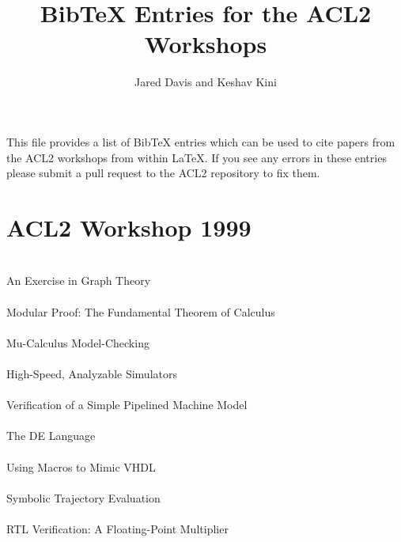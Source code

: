 \documentclass{article}
\title{BibTeX Entries for the ACL2 Workshops}
\author{Jared Davis and Keshav Kini}
\begin{document}
\maketitle

This file provides a list of BibTeX entries which can be used to cite papers
from the ACL2 workshops from within \LaTeX{}.  If you see any errors in these
entries please submit a pull request to the ACL2 repository to fix them.


\section{ACL2 Workshop 1999}

\cite{99-moore-graph} \\
An Exercise in Graph Theory \\

\cite{99-kaufmann-ftc} \\
Modular Proof: The Fundamental Theorem of Calculus \\

\cite{99-manolios-mu} \\
Mu-Calculus Model-Checking \\

\cite{99-greve-simulators} \\
High-Speed, Analyzable Simulators \\

\cite{99-sawada-pipelined} \\
Verification of a Simple Pipelined Machine Model \\

\cite{99-hunt-de} \\
The {DE} Language \\

\cite{99-borrione-vhdl} \\
Using Macros to Mimic {VHDL} \\

\cite{99-jamsek-ste} \\
Symbolic Trajectory Evaluation \\

\cite{99-russinoff-rtl} \\
{RTL} Verification: A Floating-Point Multiplier \\
\end{document}

